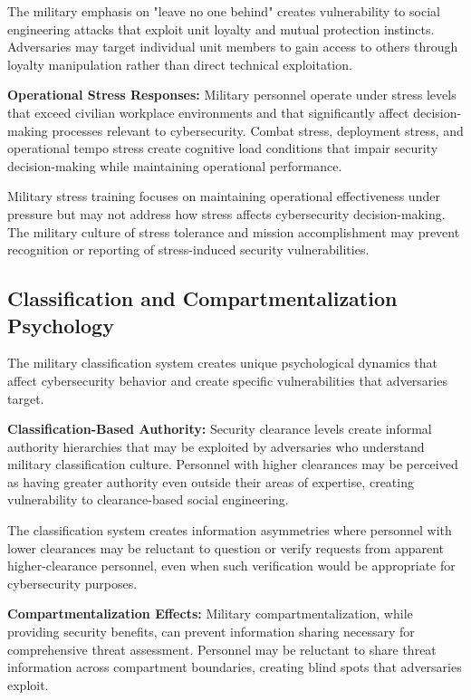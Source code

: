 \documentclass[10pt, twocolumn]{article}
\begin{document}
The military emphasis on "leave no one behind" creates vulnerability to social engineering attacks that exploit unit loyalty and mutual protection instincts. Adversaries may target individual unit members to gain access to others through loyalty manipulation rather than direct technical exploitation.

\textbf{Operational Stress Responses:} Military personnel operate under stress levels that exceed civilian workplace environments and that significantly affect decision-making processes relevant to cybersecurity. Combat stress, deployment stress, and operational tempo stress create cognitive load conditions that impair security decision-making while maintaining operational performance.

Military stress training focuses on maintaining operational effectiveness under pressure but may not address how stress affects cybersecurity decision-making. The military culture of stress tolerance and mission accomplishment may prevent recognition or reporting of stress-induced security vulnerabilities.

\subsection{Classification and Compartmentalization Psychology}

The military classification system creates unique psychological dynamics that affect cybersecurity behavior and create specific vulnerabilities that adversaries target.

\textbf{Classification-Based Authority:} Security clearance levels create informal authority hierarchies that may be exploited by adversaries who understand military classification culture. Personnel with higher clearances may be perceived as having greater authority even outside their areas of expertise, creating vulnerability to clearance-based social engineering.

The classification system creates information asymmetries where personnel with lower clearances may be reluctant to question or verify requests from apparent higher-clearance personnel, even when such verification would be appropriate for cybersecurity purposes.

\textbf{Compartmentalization Effects:} Military compartmentalization, while providing security benefits, can prevent information sharing necessary for comprehensive threat assessment. Personnel may be reluctant to share threat information across compartment boundaries, creating blind spots that adversaries exploit.
\end{document}
